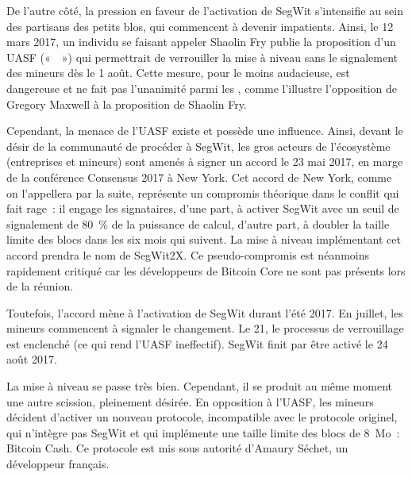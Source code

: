 De l'autre côté, la pression en faveur de l'activation de SegWit s'intensifie au sein des partisans des petits blos, qui commencent à devenir impatients. Ainsi, le 12 mars 2017, un individu se faisant appeler Shaolin Fry publie la proposition d'un UASF («~~») qui permettrait de verrouiller la mise à niveau sans le signalement des mineurs dès le 1\ier{} août. Cette mesure, pour le moins audacieuse, est dangereuse et ne fait pas l'unanimité parmi les , comme l'illustre l'opposition de Gregory Maxwell à la proposition de Shaolin Fry.

Cependant, la menace de l'UASF existe et possède une influence. Ainsi, devant le désir de la communauté de procéder à SegWit, les gros acteurs de l'écosystème (entreprises et mineurs) sont amenés à signer un accord le 23 mai 2017, en marge de la conférence Consensus 2017 à New York. Cet accord de New York, comme on l'appellera par la suite, représente un compromis théorique dans le conflit qui fait rage~: il engage les signataires, d'une part, à activer SegWit avec un seuil de signalement de 80~\% de la puissance de calcul, d'autre part, à doubler la taille limite des blocs dans les six mois qui suivent. La mise à niveau implémentant cet accord prendra le nom de SegWit2X. Ce pseudo-compromis est néanmoins rapidement critiqué car les développeurs de Bitcoin Core ne sont pas présents lors de la réunion.

Toutefois, l'accord mène à l'activation de SegWit durant l'été 2017. En juillet, les mineurs commencent à signaler le changement. Le 21, le processus de verrouillage est enclenché (ce qui rend l'UASF ineffectif). SegWit finit par être activé le 24 août 2017.

La mise à niveau se passe très bien. Cependant, il se produit au même moment une autre scission, pleinement désirée. En opposition à l'UASF, les mineurs décident d'activer un nouveau protocole, incompatible avec le protocole originel, qui n'intègre pas SegWit et qui implémente une taille limite des blocs de 8~Mo~: Bitcoin Cash. Ce protocole est mis sous autorité d'Amaury Séchet, un développeur français.

